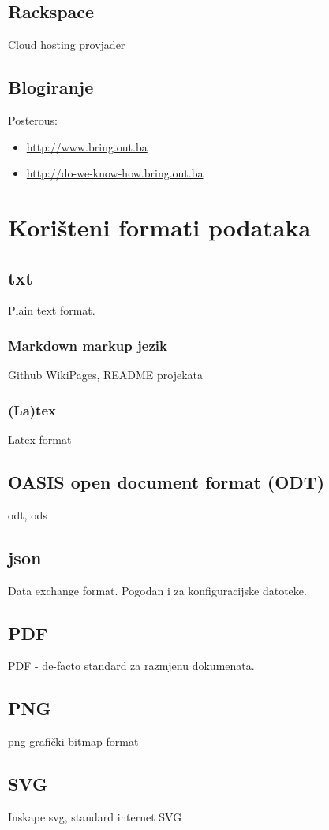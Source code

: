 \documentclass[times, utf8, seminar]{fit}
\begin{document}
\section{Rackspace}

Cloud hosting provjader

\section{Blogiranje}

Posterous:

\begin{itemize}
  \item \url{http://www.bring.out.ba}
  \item \url{http://do-we-know-how.bring.out.ba}
\end{itemize}


\chapter{Korišteni formati podataka}

\section{txt}

Plain text format.

\subsection{Markdown markup jezik}

Github WikiPages, README projekata

\subsection{(La)tex}

Latex format

\section{OASIS open document format (ODT)}

odt, ods

\section{json}

Data exchange format.  Pogodan i za konfiguracijske datoteke.

\section{PDF}

PDF - de-facto standard za razmjenu dokumenata.

\section{PNG}

png grafički bitmap format

\section{SVG}

Inskape svg, standard internet SVG


%
%
\end{document}
